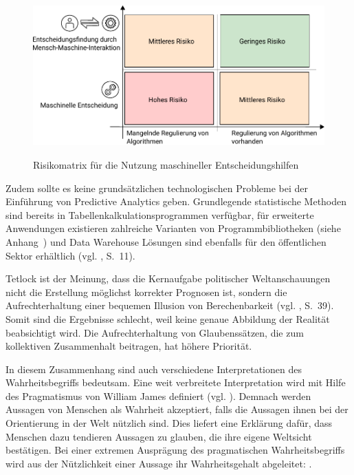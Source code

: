 \begin{figure}%
\centering
\caption{Risikomatrix für die Nutzung maschineller Entscheidungshilfen}
\includegraphics[scale=1.0]{Grafiken/Risk_Matrix_Ink.pdf} 
\label{pic:Risiko_Matrix}
\end{figure}

Zudem sollte es keine grundsätzlichen technologischen Probleme bei der Einführung von
Predictive Analytics geben. Grundlegende statistische Methoden sind bereits in
Tabellenkalkulationsprogrammen verfügbar, für erweiterte Anwendungen existieren zahlreiche
Varianten von Programmbibliotheken (siehe Anhang~\xcom) und Data Warehouse Lösungen sind
ebenfalls für den öffentlichen Sektor erhältlich (vgl. \cite{IT_Novum}, S.~11).

Tetlock ist der Meinung, dass die Kernaufgabe politischer Weltanschauungen
nicht die Erstellung möglichst korrekter Prognosen ist, sondern die
Aufrechterhaltung einer bequemen Illusion von Berechenbarkeit
(vgl. \cite{Tetlock}, S.~39). Somit sind die Ergebnisse schlecht, weil keine
genaue Abbildung der Realität beabsichtigt wird. Die Aufrechterhaltung von
Glaubenssätzen, die zum kollektiven Zusammenhalt beitragen, hat höhere
Priorität.

In diesem Zusammenhang sind auch verschiedene Interpretationen des
Wahrheitsbegriffs bedeutsam. Eine weit verbreitete Interpretation wird mit
Hilfe des Pragmatismus von William James definiert (vgl. \cite{Precht}). Demnach werden
Aussagen von Menschen als Wahrheit akzeptiert, falls die Aussagen ihnen bei der
Orientierung in der Welt nützlich sind. Dies liefert eine Erklärung dafür, dass
Menschen dazu tendieren Aussagen zu glauben, die ihre eigene Weltsicht
bestätigen. Bei einer extremen Ausprägung des pragmatischen Wahrheitsbegriffs
wird aus der Nützlichkeit einer Aussage ihr Wahrheitsgehalt abgeleitet:
\grqq.

